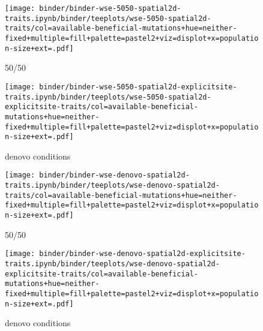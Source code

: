 \begin{sidewaysfigure}[h]
  \rotatesidewayslabel
    \begin{subfigure}[b]{0.47\linewidth}
        \begin{minipage}{\textwidth}
          \texttt{[image: binder/binder-wse-5050-spatial2d-traits.ipynb/binder/teeplots/wse-5050-spatial2d-traits/col=available-beneficial-mutations+hue=neither-fixed+multiple=fill+palette=pastel2+viz=displot+x=population-size+ext=.pdf]}%
        \end{minipage}
        \begin{minipage}{\textwidth}
        \caption{50/50}
        \label{fig:neither-fixed-wse:5050}
        \end{minipage}%
    \end{subfigure}%
    \begin{subfigure}[b]{0.53\linewidth}
        \begin{minipage}{\textwidth}
          \texttt{[image: binder/binder-wse-5050-spatial2d-explicitsite-traits.ipynb/binder/teeplots/wse-5050-spatial2d-explicitsite-traits/col=available-beneficial-mutations+hue=neither-fixed+multiple=fill+palette=pastel2+viz=displot+x=population-size+ext=.pdf]}%
        \end{minipage}
        \begin{minipage}{\textwidth}
        \caption{denovo conditions}
        \label{fig:neither-fixed-wse:5050-explicitsite}
        \end{minipage}%
    \end{subfigure}

\begin{subfigure}[b]{0.47\linewidth}
    \begin{minipage}{\textwidth}
      \texttt{[image: binder/binder-wse-denovo-spatial2d-traits.ipynb/binder/teeplots/wse-denovo-spatial2d-traits/col=available-beneficial-mutations+hue=neither-fixed+multiple=fill+palette=pastel2+viz=displot+x=population-size+ext=.pdf]}%
    \end{minipage}
    \begin{minipage}{\textwidth}
    \caption{50/50}
    \label{fig:neither-fixed-wse:denovo}
    \end{minipage}%
\end{subfigure}%
\begin{subfigure}[b]{0.53\linewidth}
    \begin{minipage}{\textwidth}
      \texttt{[image: binder/binder-wse-denovo-spatial2d-explicitsite-traits.ipynb/binder/teeplots/wse-denovo-spatial2d-explicitsite-traits/col=available-beneficial-mutations+hue=neither-fixed+multiple=fill+palette=pastel2+viz=displot+x=population-size+ext=.pdf]}%
    \end{minipage}
    \begin{minipage}{\textwidth}
    \caption{denovo conditions}
    \label{fig:neither-fixed-wse:denovo-explicitsite}
    \end{minipage}%
\end{subfigure}


\end{sidewaysfigure}
